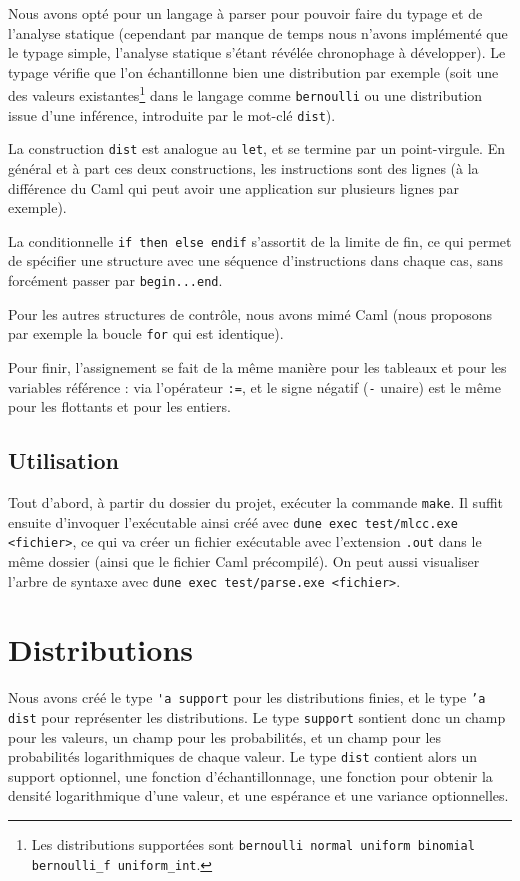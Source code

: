 \documentclass[svgnames]{article}
\begin{document}
Nous avons opté pour un langage à parser pour pouvoir faire du typage et de l'analyse statique (cependant par manque de temps nous n'avons implémenté que le typage simple, l'analyse statique s'étant révélée chronophage à développer).
Le typage vérifie que l'on échantillonne bien une distribution par exemple (soit une des valeurs existantes\footnote{Les distributions supportées sont \texttt{bernoulli normal uniform binomial bernoulli\_f uniform\_int}.} dans le langage comme \verb|bernoulli| ou une distribution issue d'une inférence, introduite par le mot-clé \lstinline{dist}).

La construction \lstinline{dist} est analogue au \lstinline{let}, et se termine par un point-virgule. En général et à part ces deux constructions, les instructions sont des lignes (à la différence du Caml qui peut avoir une application sur plusieurs lignes par exemple). 

La conditionnelle \lstinline{if then else endif} s'assortit de la limite de fin, ce qui permet de spécifier une structure avec une séquence d'instructions dans chaque cas, sans forcément passer par \lstinline{begin...end}.

Pour les autres structures de contrôle, nous avons mimé Caml (nous proposons par exemple la boucle \lstinline{for} qui est identique).

Pour finir, l'assignement se fait de la même manière pour les tableaux et pour les variables référence : via l'opérateur \verb|:=|, et le signe négatif (\verb|-| unaire) est le même pour les flottants et pour les entiers.

\subsection{Utilisation}

Tout d'abord, à partir du dossier du projet, exécuter la commande \verb|make|. Il suffit ensuite d'invoquer l'exécutable ainsi créé avec \verb|dune exec test/mlcc.exe <fichier>|, ce qui va créer un fichier exécutable avec l'extension \verb|.out| dans le même dossier (ainsi que le fichier Caml précompilé). On peut aussi visualiser l'arbre de syntaxe avec \verb|dune exec test/parse.exe <fichier>|.

\section{Distributions}

Nous avons créé le type \verb|'a support| pour les distributions finies, et le type \texttt{'a dist} pour représenter les distributions. Le type \texttt{support} sontient donc un champ pour les valeurs, un champ pour les probabilités, et un champ pour les probabilités logarithmiques de chaque valeur. Le type \texttt{dist} contient alors un support optionnel, une fonction d'échantillonnage, une fonction pour obtenir la densité logarithmique d'une valeur, et une espérance et une variance optionnelles.
\end{document}
